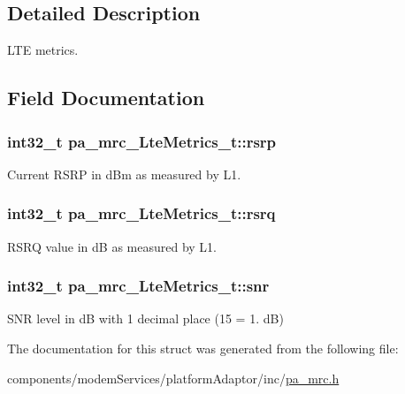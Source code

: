 \subsection{Detailed Description}
L\+TE metrics. 

\subsection{Field Documentation}
\subsubsection[{\texorpdfstring{rsrp}{rsrp}}]{\setlength{\rightskip}{0pt plus 5cm}int32\+\_\+t pa\+\_\+mrc\+\_\+\+Lte\+Metrics\+\_\+t\+::rsrp}\hypertarget{structpa__mrc___lte_metrics__t_aebd9ffa2c98a684681b0e125bf8f7b35}{}\label{structpa__mrc___lte_metrics__t_aebd9ffa2c98a684681b0e125bf8f7b35}


Current R\+S\+RP in d\+Bm as measured by L1. 

\subsubsection[{\texorpdfstring{rsrq}{rsrq}}]{\setlength{\rightskip}{0pt plus 5cm}int32\+\_\+t pa\+\_\+mrc\+\_\+\+Lte\+Metrics\+\_\+t\+::rsrq}\hypertarget{structpa__mrc___lte_metrics__t_a122cc447b6a6eb0d3e08ea6163cccaa8}{}\label{structpa__mrc___lte_metrics__t_a122cc447b6a6eb0d3e08ea6163cccaa8}


R\+S\+RQ value in dB as measured by L1. 

\subsubsection[{\texorpdfstring{snr}{snr}}]{\setlength{\rightskip}{0pt plus 5cm}int32\+\_\+t pa\+\_\+mrc\+\_\+\+Lte\+Metrics\+\_\+t\+::snr}\hypertarget{structpa__mrc___lte_metrics__t_aee4c696609532fdd9b62df842bfe15fb}{}\label{structpa__mrc___lte_metrics__t_aee4c696609532fdd9b62df842bfe15fb}


S\+NR level in dB with 1 decimal place (15 = 1. dB) 



The documentation for this struct was generated from the following file\+:\begin{DoxyCompactItemize}
\item 
components/modem\+Services/platform\+Adaptor/inc/\hyperlink{pa__mrc_8h}{pa\+\_\+mrc.\+h}\end{DoxyCompactItemize}
